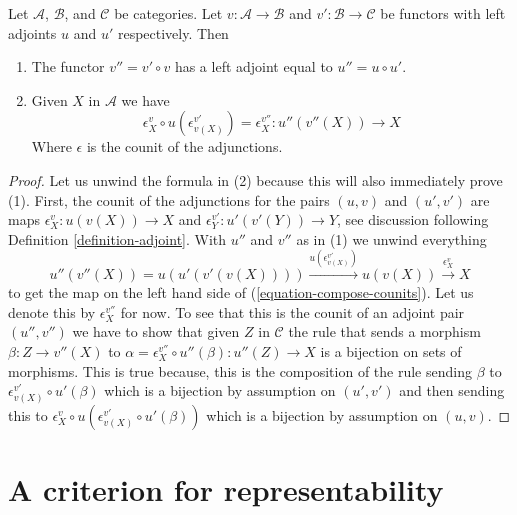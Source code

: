 \begin{lemma}
\label{lemma-compose-counits}
Let $\mathcal{A}$, $\mathcal{B}$, and $\mathcal{C}$ be categories.
Let $v : \mathcal{A} \to \mathcal{B}$ and
$v' : \mathcal{B} \to \mathcal{C}$ be functors
with left adjoints $u$ and $u'$ respectively. Then
\begin{enumerate}
\item The functor $v'' = v' \circ v$ has a left adjoint equal to
$u'' = u \circ u'$.
\item Given $X$ in $\mathcal{A}$ we have
\begin{equation}
\label{equation-compose-counits}
\epsilon_X^v \circ u(\epsilon^{v'}_{v(X)}) = \epsilon^{v''}_X :
u''(v''(X)) \to X
\end{equation}
Where $\epsilon$ is the counit of the adjunctions.
\end{enumerate}
\end{lemma}

\begin{proof}
Let us unwind the formula in (2) because this will also immediately
prove (1). First, the counit of the adjunctions for the pairs
$(u, v)$ and $(u', v')$ are maps
$\epsilon_X^v : u(v(X)) \to X$ and
$\epsilon_Y^{v'} : u'(v'(Y)) \to Y$, see discussion following
Definition \ref{definition-adjoint}.
With $u''$ and $v''$ as in (1) we unwind everything
$$
u''(v''(X)) = u(u'(v'(v(X)))) \xrightarrow{u(\epsilon_{v(X)}^{v'})}
u(v(X)) \xrightarrow{\epsilon_X^v} X
$$
to get the map on the left hand side of (\ref{equation-compose-counits}).
Let us denote this by $\epsilon_X^{v''}$ for now.
To see that this is the counit of an adjoint pair
$(u'', v'')$ we have to show that given $Z$ in $\mathcal{C}$
the rule that sends a morphism $\beta : Z \to v''(X)$
to $\alpha = \epsilon_X^{v''} \circ u''(\beta) : u''(Z) \to X$
is a bijection on sets of morphisms.
This is true because, this is the composition of the
rule sending $\beta$ to $\epsilon_{v(X)}^{v'} \circ u'(\beta)$
which is a bijection by assumption on $(u', v')$ and then
sending this to
$\epsilon_X^v \circ u(\epsilon_{v(X)}^{v'} \circ u'(\beta))$
which is a bijection by assumption on $(u, v)$.
\end{proof}






\section{A criterion for representability}
\label{section-representable}

